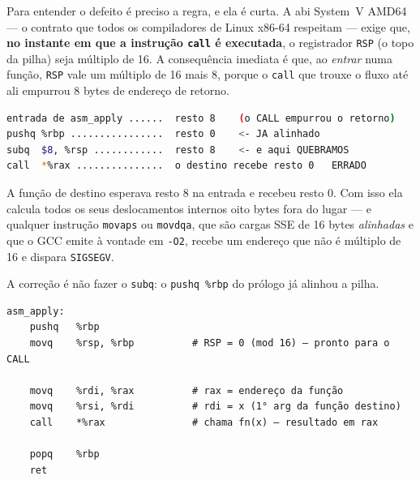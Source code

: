 Para entender o defeito é preciso a regra, e ela é curta. A \gls{abi} System~V
AMD64 --- o contrato que todos os compiladores de Linux x86-64 respeitam ---
exige que, \textbf{no instante em que a instrução \texttt{call} é executada}, o
registrador \texttt{RSP} (o topo da pilha) seja múltiplo de 16. A consequência
imediata é que, ao \emph{entrar} numa função, \texttt{RSP} vale um múltiplo de
16 mais 8, porque o \texttt{call} que trouxe o fluxo até ali empurrou 8 bytes de
endereço de retorno.

\begin{lstlisting}[style=bt, language=bash,
    caption={A aritmética do alinhamento, passo a passo. O resto é sobre 16.}]
entrada de asm_apply ......  resto 8    (o CALL empurrou o retorno)
pushq %rbp ................  resto 0    <- JA alinhado
subq  $8, %rsp ............  resto 8    <- e aqui QUEBRAMOS
call  *%rax ...............  o destino recebe resto 0   ERRADO
\end{lstlisting}

A função de destino esperava resto 8 na entrada e recebeu resto 0. Com isso ela
calcula todos os seus deslocamentos internos oito bytes fora do lugar --- e
qualquer instrução \texttt{movaps} ou \texttt{movdqa}, que são cargas SSE de 16
bytes \emph{alinhadas} e que o GCC emite à vontade em \texttt{-O2}, recebe um
endereço que não é múltiplo de 16 e dispara \texttt{SIGSEGV}.

A correção é não fazer o \texttt{subq}: o \texttt{pushq \%rbp} do prólogo já
alinhou a pilha.

\begin{lstlisting}[style=bt, language=GAS,
    caption={A versão corrigida, em
             \texttt{src/asm\_course/07\_calling\_asm.s}.}]
asm_apply:
    pushq   %rbp
    movq    %rsp, %rbp          # RSP = 0 (mod 16) — pronto para o CALL

    movq    %rdi, %rax          # rax = endereço da função
    movq    %rsi, %rdi          # rdi = x (1° arg da função destino)
    call    *%rax               # chama fn(x) — resultado em rax

    popq    %rbp
    ret
\end{lstlisting}

